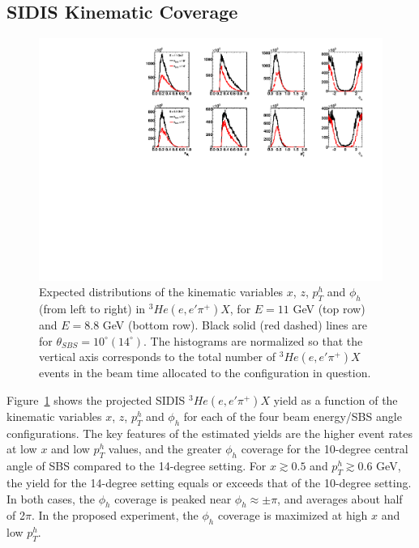 \subsection{SIDIS Kinematic Coverage}

\begin{figure}[h]
  \begin{center}
    \includegraphics[width=.98\textwidth]{figures/kine14deg10deg_comparison.pdf}
  \end{center}
  \caption{\label{kine14_10_1D} Expected distributions of the kinematic variables $x$, $z$, $p_T^h$ and $\phi_h$ (from left to right) in $^3He(e,e'\pi^+)X$, for $E = 11$ GeV (top row) and $E = 8.8$ GeV (bottom row). Black solid (red dashed) lines are for $\theta_{SBS} = 10^\circ (14^\circ)$. The histograms are normalized so that the vertical axis corresponds to the total number of $^3He(e,e'\pi^+)X$ events in the beam time allocated to the configuration in question.}
\end{figure}
Figure~\ref{kine14_10_1D} shows the projected SIDIS $^3He(e,e'\pi^+)X$ yield as a function of the kinematic variables $x$, $z$, $p_T^h$ and $\phi_h$ for each of the four beam energy/SBS angle configurations. The key features of the estimated yields are the higher event rates at low $x$ and low $p_T^h$ values, and the greater $\phi_h$ coverage for the 10-degree central angle of SBS compared to the 14-degree setting. For $x \gtrsim 0.5$ and $p_T^h \gtrsim 0.6$ GeV, the yield for the 14-degree setting equals or exceeds that of the 10-degree setting. In both cases, the $\phi_h$ coverage is peaked near $\phi_h \approx \pm \pi$, and averages about half of 2$\pi$. In the proposed experiment, the $\phi_h$ coverage is maximized at high $x$ and low $p_T^h$. 
